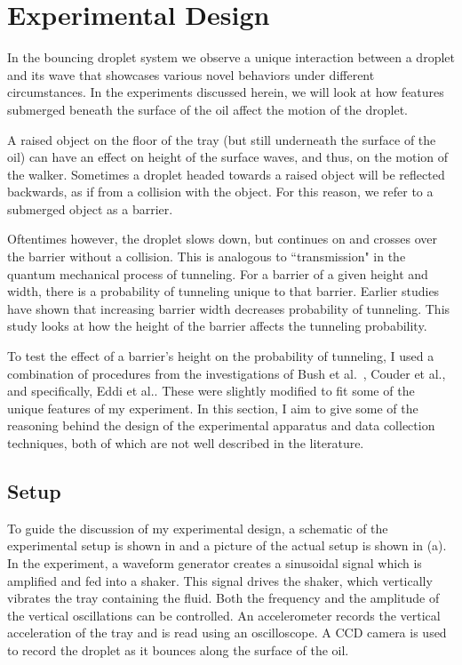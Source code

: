 \chapter{Experimental Design}
\label{Ch2}

In the bouncing droplet system we observe a unique interaction between a droplet and its wave that showcases various novel behaviors under different circumstances.  In the experiments discussed herein, we will look at how features submerged beneath the surface of the oil affect the motion of the droplet. 

A raised object on the floor of the tray (but still underneath the surface of the oil) can have an effect on height of the surface waves, and thus, on the motion of the walker. Sometimes a droplet headed towards a raised object will be reflected backwards, as if from a collision with the object. For this reason, we refer to a submerged object as a barrier. 

Oftentimes however, the droplet slows down, but continues on and crosses over the barrier without a collision. This is analogous to ``transmission" in the quantum mechanical process of tunneling. For a barrier of a given height and width, there is a probability of tunneling unique to that barrier. Earlier studies have shown that increasing barrier width decreases probability of tunneling. This study looks at how the height of the barrier affects the tunneling probability. 

To test the effect of a barrier's height on the probability of tunneling, I used a combination of procedures from the investigations of Bush et al.~, Couder et al., and specifically, Eddi et al.. These were slightly modified to fit some of the unique features of my experiment. In this section, I aim to give some of the reasoning behind the  design of the experimental apparatus and data collection techniques, both of which are not well described in the literature.

\section{Setup}
   To guide the discussion of my experimental design, a schematic of the experimental setup is shown in  and a picture of the actual setup is shown in (a). In the experiment, a waveform generator creates a sinusoidal signal which is amplified and fed into a shaker. This signal drives the shaker, which vertically vibrates the tray containing the fluid. Both the frequency and the amplitude of the vertical oscillations can be controlled. An accelerometer records the vertical acceleration of the tray and is read using an oscilloscope. A CCD camera is used to record the droplet as it bounces along the surface of the oil.  
    

